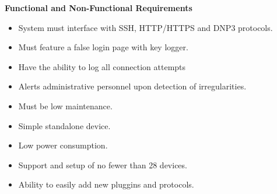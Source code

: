 \documentclass{article}
\begin{document}
\Large{\color{Blue}\textbf{Functional and Non-Functional Requirements}}
\begin{multicols}{2}
\begin{itemize}
    \item System must interface with SSH, HTTP/HTTPS and DNP3 protocols.
    \item Must feature a false login page with key logger.
    \item Have the ability to log all connection attempts  
    \item Alerts administrative personnel upon detection of irregularities.
    \newline
    \newline
    
    \item Must be low maintenance.
    \item Simple standalone device.
    \item Low power consumption.
    \item Support and setup of no fewer than 28 devices.
    \item Ability to easily add new pluggins and protocols.
\end{itemize}
\end{multicols}
\end{document}
